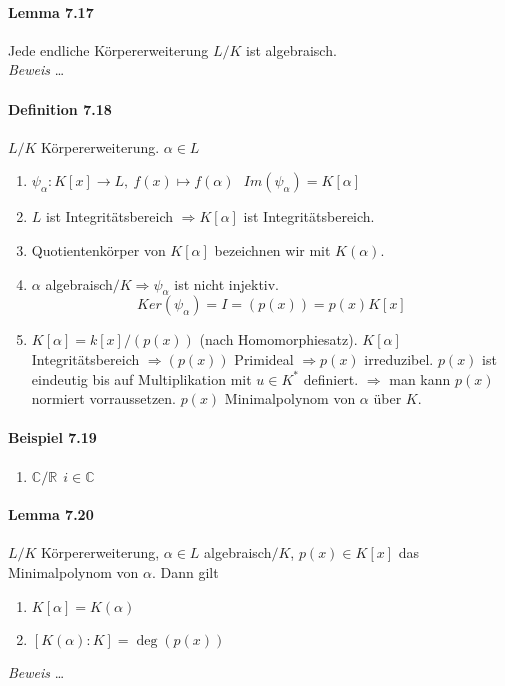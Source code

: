 \documentclass{scrartcl}
\newcommand{\R}{\mathbb{R}}
\newcommand{\C}{\mathbb{C}}
\begin{document}
\paragraph{Lemma 7.17}
Jede endliche Körpererweiterung $L/K$ ist algebraisch. \\
\textit{Beweis}
\dots

\paragraph{Definition 7.18}
$L/K$ Körpererweiterung. $\alpha\in L$
\begin{enumerate}{}
\item  $\psi_\alpha:K[x]\to L,~f(x)\mapsto f(\alpha) ~~~Im(\psi_\alpha)=K[\alpha]$
\item $L$ ist Integritätsbereich $\Rightarrow K[\alpha]$ ist Integritätsbereich.
\item Quotientenkörper von $K[\alpha]$ bezeichnen wir mit $K(\alpha)$.
\item $\alpha$ algebraisch$/K \Rightarrow \psi_\alpha$ ist nicht injektiv.
  \[
    Ker(\psi_\alpha)=I=(p(x))=p(x)K[x]
  \]
\item $K[\alpha]=k[x]/(p(x))$ (nach Homomorphiesatz). $K[\alpha]$
  Integritätsbereich $\Rightarrow (p(x))$ Primideal $\Rightarrow p(x)$
  irreduzibel. $p(x)$ ist eindeutig bis auf Multiplikation mit $u\in K^*$
  definiert. $\Rightarrow$ man kann $p(x)$ normiert vorraussetzen. $p(x)$
  Minimalpolynom von $\alpha$ über $K$.
\end{enumerate}

\paragraph{Beispiel 7.19}
\begin{enumerate}{}
\item $\C/\R~~i\in\C$
\end{enumerate}

\paragraph{Lemma 7.20}
$L/K$ Körpererweiterung, $\alpha\in L$ algebraisch$/K$, $p(x)\in K[x]$ das
Minimalpolynom von $\alpha$. Dann gilt
\begin{enumerate}{}
\item $K[\alpha]=K(\alpha)$
\item $[K(\alpha):K]=\deg(p(x))$
\end{enumerate}
\textit{Beweis} \dots
\end{document}
